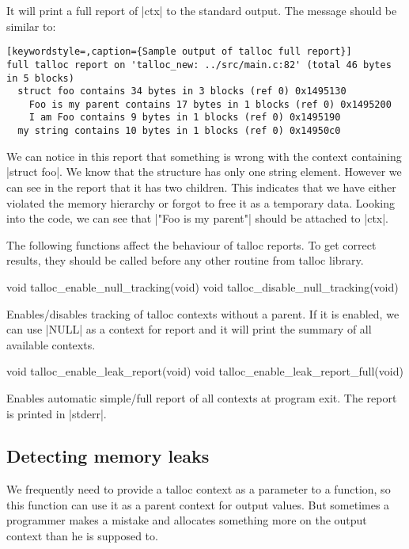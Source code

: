 \noindent
It will print a full report of |ctx| to the standard output. The message should
be similar to:

\begin{lstlisting}[keywordstyle=,caption={Sample output of talloc full report}]
full talloc report on 'talloc_new: ../src/main.c:82' (total 46 bytes in 5 blocks)
  struct foo contains 34 bytes in 3 blocks (ref 0) 0x1495130
    Foo is my parent contains 17 bytes in 1 blocks (ref 0) 0x1495200
    I am Foo contains 9 bytes in 1 blocks (ref 0) 0x1495190
  my string contains 10 bytes in 1 blocks (ref 0) 0x14950c0
\end{lstlisting}

\noindent
We can notice in this report that something is wrong with the context containing
|struct foo|. We know that the structure has only one string element. However we
can see in the report that it has two children. This indicates that we have
either violated the memory hierarchy or forgot to free it as a temporary data.
Looking into the code, we can see that |"Foo is my parent"| should be attached
to |ctx|.

The following functions affect the behaviour of talloc reports. To get correct
results, they should be called before any other routine from talloc library.

\begin{funcproto}
void talloc_enable_null_tracking(void)
void talloc_disable_null_tracking(void)
\end{funcproto}
\begin{funcdesc}
Enables/disables tracking of talloc contexts without a parent. If it is enabled,
we can use |NULL| as a context for report and it will print the summary of all
available contexts.
\end{funcdesc}

\begin{funcproto}
void talloc_enable_leak_report(void)
void talloc_enable_leak_report_full(void)
\end{funcproto}
\begin{funcdesc}
  Enables automatic simple/full report of all contexts at program exit. The
  report is printed in |stderr|.
\end{funcdesc}

\subsection{Detecting memory leaks}

We frequently need to provide a talloc context as a parameter to a function, so
this function can use it as a parent context for output values. But sometimes a
programmer makes a mistake and allocates something more on the output context
than he is supposed to.

